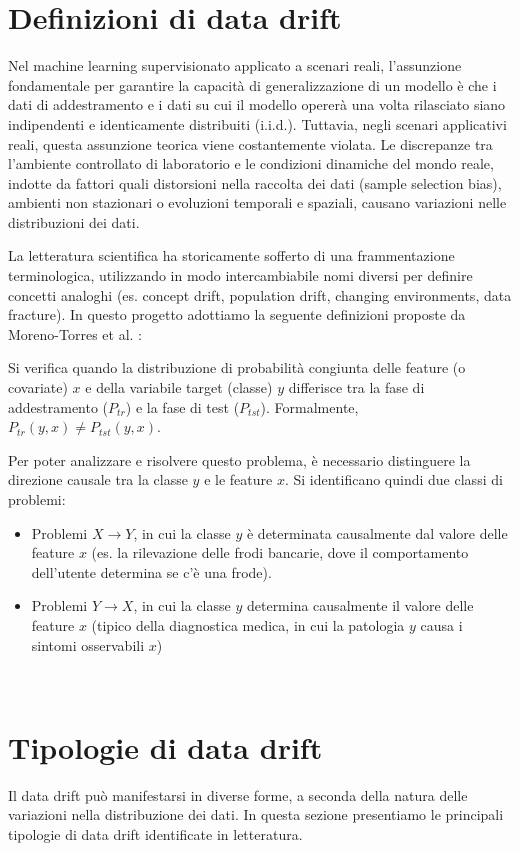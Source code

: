 \section{Definizioni di data drift}
Nel machine learning supervisionato applicato a scenari reali, l'assunzione fondamentale per garantire la capacità di generalizzazione di un modello è che i dati di addestramento e i dati su cui il modello opererà una volta rilasciato siano indipendenti e identicamente distribuiti (i.i.d.)\cite{moreno-torres_unifying_2012, tamang_handling_2025}. Tuttavia, negli scenari applicativi reali, questa assunzione teorica viene costantemente violata. Le discrepanze tra l'ambiente controllato di laboratorio e le condizioni dinamiche del mondo reale, indotte da fattori quali distorsioni nella raccolta dei dati (sample selection bias), ambienti non stazionari o evoluzioni temporali e spaziali, causano variazioni nelle distribuzioni dei dati.

La letteratura scientifica ha storicamente sofferto di una frammentazione terminologica, utilizzando in modo intercambiabile nomi diversi per definire concetti analoghi (es. concept drift, population drift, changing environments, data fracture)\cite{moreno-torres_unifying_2012}. In questo progetto adottiamo la seguente definizioni proposte da Moreno-Torres et al. \cite{moreno-torres_unifying_2012}:
\begin{definition}
	Si verifica quando la distribuzione di probabilità congiunta delle feature (o covariate) $x$ e della variabile target (classe) $y$ differisce tra la fase di addestramento ($P_{tr}$) e la fase di test ($P_{tst}$).
	Formalmente, $P_{tr}(y,x) \neq P_{tst}(y,x)$.
\end{definition}
Per poter analizzare e risolvere questo problema, è necessario distinguere la direzione causale tra la classe $y$ e le feature $x$. Si identificano quindi due classi di problemi:
\begin{itemize}
	\item Problemi $X\rightarrow Y$, in cui la classe $y$ è determinata causalmente dal valore delle feature $x$ (es. la rilevazione delle frodi bancarie, dove il comportamento dell'utente determina se c'è una frode).
	\item Problemi $Y\rightarrow X$, in cui la classe $y$ determina causalmente il valore delle feature $x$ (tipico della diagnostica medica, in cui la patologia $y$ causa i sintomi osservabili $x$)
\end{itemize}\
\section{Tipologie di data drift}
Il data drift può manifestarsi in diverse forme, a seconda della natura delle variazioni nella distribuzione dei dati. In questa sezione presentiamo le principali tipologie di data drift identificate in letteratura.

